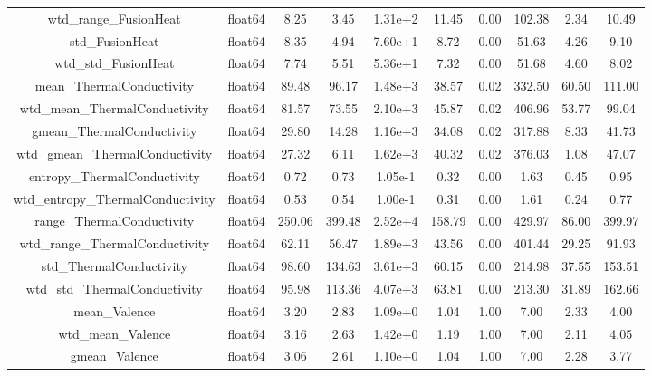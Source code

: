 \documentclass[11pt]{article}
\begin{document}
\begin{table}
{\begin{tabular}{|c|c|c|c|c|c|c|c|c|c|}
wtd\_range\_FusionHeat             & float64&     8.25&     3.45&  1.31e+2&    11.45&    0.00&    102.38&     2.34&    10.49 \\
std\_FusionHeat                   & float64&     8.35&     4.94&  7.60e+1&     8.72&    0.00&     51.63&     4.26&     9.10 \\
wtd\_std\_FusionHeat               & float64&     7.74&     5.51&  5.36e+1&     7.32&    0.00&     51.68&     4.60&     8.02 \\
mean\_ThermalConductivity         & float64&    89.48&    96.17&  1.48e+3&    38.57&    0.02&    332.50&    60.50&   111.00 \\
wtd\_mean\_ThermalConductivity     & float64&    81.57&    73.55&  2.10e+3&    45.87&    0.02&    406.96&    53.77&    99.04 \\
gmean\_ThermalConductivity        & float64&    29.80&    14.28&  1.16e+3&    34.08&    0.02&    317.88&     8.33&    41.73 \\
wtd\_gmean\_ThermalConductivity    & float64&    27.32&     6.11&  1.62e+3&    40.32&    0.02&    376.03&     1.08&    47.07 \\
entropy\_ThermalConductivity      & float64&     0.72&     0.73&  1.05e-1&     0.32&    0.00&      1.63&     0.45&     0.95 \\
wtd\_entropy\_ThermalConductivity  & float64&     0.53&     0.54&  1.00e-1&     0.31&    0.00&      1.61&     0.24&     0.77 \\
range\_ThermalConductivity        & float64&   250.06&   399.48&  2.52e+4&   158.79&    0.00&    429.97&    86.00&   399.97 \\
wtd\_range\_ThermalConductivity    & float64&    62.11&    56.47&  1.89e+3&    43.56&    0.00&    401.44&    29.25&    91.93 \\
std\_ThermalConductivity          & float64&    98.60&   134.63&  3.61e+3&    60.15&    0.00&    214.98&    37.55&   153.51 \\
wtd\_std\_ThermalConductivity      & float64&    95.98&   113.36&  4.07e+3&    63.81&    0.00&    213.30&    31.89&   162.66 \\
mean\_Valence                     & float64&     3.20&     2.83&  1.09e+0&     1.04&    1.00&      7.00&     2.33&     4.00 \\
wtd\_mean\_Valence                 & float64&     3.16&     2.63&  1.42e+0&     1.19&    1.00&      7.00&     2.11&     4.05 \\
gmean\_Valence                    & float64&     3.06&     2.61&  1.10e+0&     1.04&    1.00&      7.00&     2.28&     3.77 \\

\end{tabular}}
\end{table}
\end{document}
